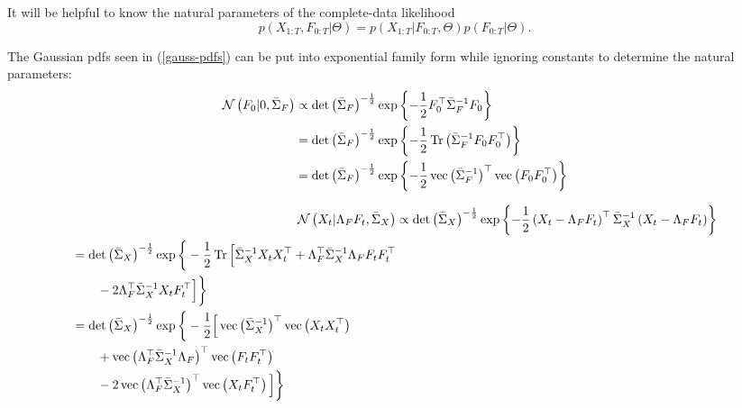 It will be helpful to know the natural parameters of the complete-data likelihood 
\begin{equation}
	p \left( X_{1:T}, F_{0:T} | \Theta \right) = p \left( X_{1:T} | F_{0:T}, \Theta \right) p \left( F_{0:T} | \Theta \right).
\end{equation}

The Gaussian pdfs seen in (\ref{gauss-pdfs}) can be put into exponential family form while ignoring constants to determine the natural parameters:
\begin{align}
	\mathcal N \left( F_0 | 0, \bar{\Sigma}_F \right) &\propto \det \left( \bar{\Sigma}_F \right)^{-\frac12} \exp \left\{ -\frac12 F_0^{\top} \bar{\Sigma}_F^{-1} F_0 \right\} \nonumber \\
	&= \det \left( \bar{\Sigma}_F \right)^{-\frac12} \exp \left\{ -\frac12 \operatorname{Tr} \left( \bar{\Sigma}_F^{-1} F_0 F_0^{\top} \right) \right\} \nonumber \\
	&= \det \left( \bar{\Sigma}_F \right)^{-\frac12} \exp \left\{ -\frac12 \operatorname{vec} \left( \bar{\Sigma}_F^{-1} \right)^{\top} \operatorname{vec} \left( F_0 F_0^{\top} \right) \right\}
\end{align} 

\begin{align}
	\mathcal N \left( X_t | \Lambda_F F_t, \bar{\Sigma}_X \right) & \propto \det \left( \bar{\Sigma}_X \right)^{-\frac12} \exp \left\{ -\frac12 \left( X_t - \Lambda_F F_t \right)^{\top} \bar{\Sigma}_X^{-1}  \left( X_t - \Lambda_F F_t \right) \right\} \nonumber \\
	\begin{split}
		&= \det \left( \bar{\Sigma}_X \right)^{-\frac12} \exp \bigg\{ -\frac12 \operatorname{Tr} \Big[ \bar{\Sigma}_X^{-1}  X_t X_t ^{\top} + \Lambda_F^{\top}  \bar{\Sigma}_X^{-1} \Lambda_F F_t F_t^{\top} \\
		&\qquad - 2 \Lambda_F^{\top}  \bar{\Sigma}_X^{-1} X_t F_t^{\top} \Big] \bigg\} \\
		&= \det \left( \bar{\Sigma}_X \right)^{-\frac12} \exp \bigg\{ -\frac12 \Big[ \operatorname{vec} \left( \bar{\Sigma}_X^{-1} \right)^{\top} \operatorname{vec} \left( X_t X_t^{\top} \right) \\
		&\qquad + \operatorname{vec} \left( \Lambda_F^{\top}  \bar{\Sigma}_X^{-1} \Lambda_F \right)^{\top} \operatorname{vec} \left( F_t F_t^{\top} \right) \\
		&\qquad -2 \operatorname{vec} \left( \Lambda_F^{\top} \bar{\Sigma}_X^{-1} \right)^{\top} \operatorname{vec} \left( X_t F_t^{\top} \right) \Big] \bigg\}
	\end{split}
\end{align}

